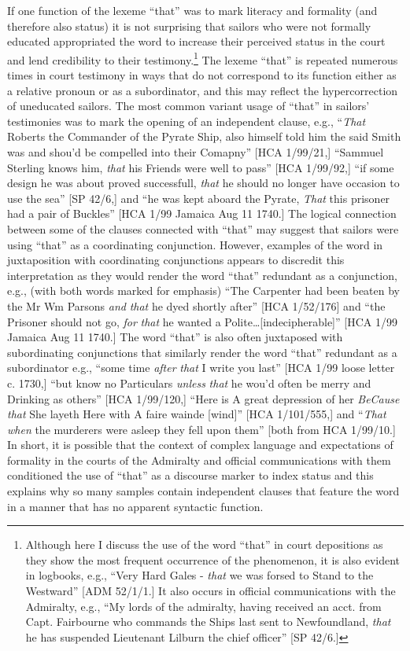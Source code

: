   If one function of the lexeme “that” was to mark literacy and formality (and therefore also status) it is not surprising that sailors who were not formally educated appropriated the word to increase their perceived status in the court and lend credibility to their testimony.\footnote{Although here I discuss the use of the word “that” in court depositions as they show the most frequent occurrence of the phenomenon, it is also evident in logbooks, e.g., “Very Hard Gales - \textit{that} we was forsed to Stand to the Westward” [ADM 52/1/1.] It also occurs in official communications with the Admiralty, e.g., “My lords of the admiralty, having received an acct. from Capt. Fairbourne who commands the Ships last sent to Newfoundland, \textit{that} he has suspended Lieutenant Lilburn the chief officer” [SP 42/6.]}   The lexeme “that” is repeated numerous times in court testimony in ways that do not correspond to its function either as a relative pronoun or as a subordinator, and this may reflect the hypercorrection of uneducated sailors. The most common variant usage of “that” in sailors’ testimonies was to mark the opening of an independent clause, e.g., “\textit{That} Roberts the Commander of the Pyrate Ship, also himself told him the said Smith was and shou’d be compelled into their Comapny” [HCA 1/99/21,] “Sammuel Sterling knows him, \textit{that} his Friends were well to pass” [HCA 1/99/92,] “if some design he was about proved successfull, \textit{that} he should no longer have occasion to use the sea” [SP 42/6,] and “he was kept aboard the Pyrate, \textit{That} this prisoner had a pair of Buckles” [HCA 1/99 Jamaica Aug 11 1740.] The logical connection between some of the clauses connected with “that” may suggest that sailors were using “that” as a coordinating conjunction. However, examples of the word in juxtaposition with coordinating conjunctions appears to discredit this interpretation as they would render the word “that” redundant as a conjunction, e.g., (with both words marked for emphasis) “The Carpenter had been beaten by the Mr Wm Parsons \textit{and} \textit{that} he dyed shortly after” [HCA 1/52/176] and “the Prisoner should not go, \textit{for} \textit{that} he wanted a Polite…[indecipherable]” [HCA 1/99 Jamaica Aug 11 1740.] The word “that” is also often juxtaposed with subordinating conjunctions that similarly render the word “that” redundant as a subordinator e.g., “some time \textit{after} \textit{that} I write you last” [HCA 1/99 loose letter c. 1730,] “but know no Particulars \textit{unless} \textit{that} he wou’d often be merry and Drinking as others” [HCA 1/99/120,] “Here is A great depression of her \textit{BeCause} \textit{that} She layeth Here with A faire wainde [wind]” [HCA 1/101/555,] and “\textit{That} \textit{when} the murderers were asleep they fell upon them” [both from HCA 1/99/10.] In short, it is possible that the context of complex language and expectations of formality in the courts of the Admiralty and official communications with them conditioned the use of “that” as a discourse marker to index status and this explains why so many samples contain independent clauses that feature the word in a manner that has no apparent syntactic function.


